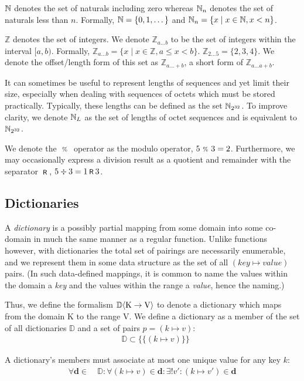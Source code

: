$\mathbb{N}$ denotes the set of naturals including zero whereas $\mathbb{N}_n$ denotes the set of naturals less than $n$. Formally, $\mathbb{N} = \{0, 1, \dots \}$ and $\mathbb{N}_n = \{ x \mid x \in \mathbb{N}, x < n \}$.

$\mathbb{Z}$ denotes the set of integers. We denote $\mathbb{Z}_{a \dots b}$ to be the set of integers within the interval $[a, b)$. Formally, $\mathbb{Z}_{a \dots b} = \{ x \mid x \in \mathbb{Z}, a \le x < b \}$. \Eg $\mathbb{Z}_{2 \dots 5} = \{ 2, 3, 4 \}$. We denote the offset/length form of this set as $\mathbb{Z}_{a \dots +b}$, a short form of $\mathbb{Z}_{a \dots a+b}$.

It can sometimes be useful to represent lengths of sequences and yet limit their size, especially when dealing with sequences of octets which must be stored practically. Typically, these lengths can be defined as the set $\mathbb{N}_{2^{32}}$. To improve clarity, we denote $\mathbb{N}_L$ as the set of lengths of octet sequences and is equivalent to $\mathbb{N}_{2^{32}}$.

We denote the $\ \text{\scriptsize{\%}}\ $ operator as the modulo operator, \eg $5 \ \text{\scriptsize{\%}}\  3 = 2$. Furthermore, we may occasionally express a division result as a quotient and remainder with the separator $\text{\hspace{2pt}\footnotesize{\textsf{R}}\hspace{2pt}}$, \eg $5 \div 3 = 1 \text{\hspace{2pt}\footnotesize{\textsf{R}}\hspace{2pt}} 3$.

\subsection{Dictionaries}\label{sec:dictionaries}

A \emph{dictionary} is a possibly partial mapping from some domain into some co-domain in much the same manner as a regular function. Unlike functions however, with dictionaries the total set of pairings are necessarily enumerable, and we represent them in some data structure as the set of all $(key \mapsto value)$ pairs. (In such data-defined mappings, it is common to name the values within the domain a \emph{key} and the values within the range a \emph{value}, hence the naming.)

Thus, we define the formalism $\mathbb{D}\langle \mathrm{K}\to\mathrm{V}\rangle$ to denote a dictionary which maps from the domain $\mathrm{K}$ to the range $\mathrm{V}$. We define a dictionary as a member of the set of all dictionaries $\mathbb{D}$ and a set of pairs $p = (k \mapsto v)$:
\begin{align}
  &\mathbb{D} \subset \big \{ \{ (k \mapsto v) \} \big \}
\end{align}

A dictionary's members must associate at most one unique value for any key $k$:
\begin{align}
  \forall \mathbf{d} \in\ &\mathbb{D} : \forall (k \mapsto v) \in \mathbf{d} : \exists! v' : (k \mapsto v') \in \mathbf{d}
\end{align}

